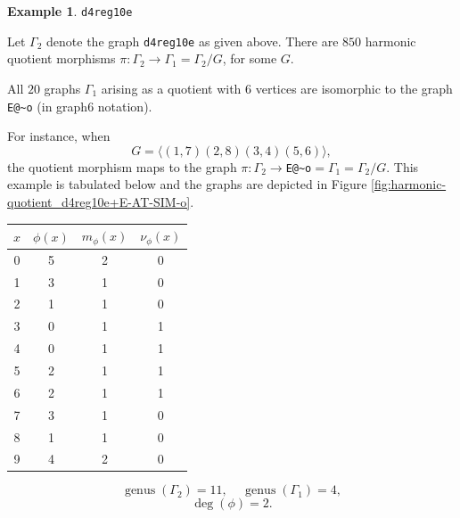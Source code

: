 \documentclass[12pt,letterpaper]{article}
\theoremstyle{definition}
\newtheorem{example}[theorem]{Example}
\DeclareMathOperator{\genus}{genus}
\begin{document}
\begin{example}%
\label{example:d4reg10e}
 {\tt d4reg10e}\newline
{\rm  
  Let $\Gamma_2$ denote the graph {\tt d4reg10e} as given above.
There are $850$ harmonic quotient morphisms
$\pi: \Gamma_2\to \Gamma_1=\Gamma_2/G$, for some $G$. 

All $20$ graphs $\Gamma_1$ arising as a quotient with
$6$ vertices are isomorphic to the graph \verb+E@~o+ (in graph6 notation). 

For instance, when
\[
G = \langle  (1,7)(2,8)(3,4)(5,6)\rangle ,
\]
the quotient morphism maps to the  graph
$\pi: \Gamma_2\to $\verb+E@~o+$=\Gamma_1=\Gamma_2/G $. This example
is tabulated below and the graphs are depicted in
Figure \ref{fig:harmonic-quotient_d4reg10e+E-AT-SIM-o}.

\begin{center}
\begin{tabular}{c|c|c|c}  
  $x$ & $\phi(x)$ & $m_\phi(x)$ & $\nu_\phi(x)$ \\ \hline
  0   &    5   &        2         &  0   \\ 
  1   &    3   &        1         &  0  \\ 
  2   &    1   &        1         &  0  \\ 
  3   &    0   &        1         &  1  \\ 
  4   &    0   &        1         &  1   \\
  5   &    2   &        1         &  1   \\
  6   &    2   &        1         &  1   \\
  7   &    3   &        1         &  0   \\
  8   &    1   &        1         &  0   \\
  9   &    4   &        2         &  0   \\     
\end{tabular}
\end{center}

\[
  \genus(\Gamma_2) =11,\ \ \ \ \
  \genus(\Gamma_1) =4,
\]
\[
\deg(\phi) =2.
\]

}
\end{example}
\end{document}
